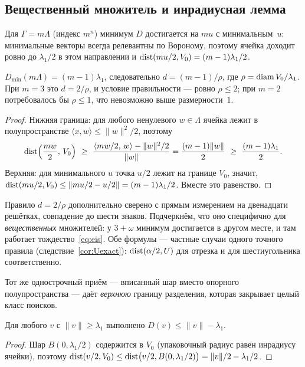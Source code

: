\subsection{Вещественный множитель и инрадиусная лемма}
\label{ssec:mult}

Для $\Gamma=m\Lambda$ (индекс $m^n$) минимум $D$ достигается на $mu$ с
минимальным~$u$: минимальные векторы всегда релевантны по Вороному, поэтому
ячейка доходит ровно до $\lambda_1/2$ в этом направлении и
$\operatorname{dist}(mu/2,V_0)=(m-1)\lambda_1/2$.

\begin{proposition}\label{prop:mult}
$D_{\min}(m\Lambda)=(m-1)\lambda_1$, следовательно
$d=(m-1)/\rho$, где $\rho=\operatorname{diam} V_0/\lambda_1$. При $m=3$ это $d=2/\rho$, и
условие правильности --- ровно $\rho\le2$; при $m=2$ потребовалось бы
$\rho\le1$, что невозможно выше размерности~$1$.
\end{proposition}

\begin{proof}
Нижняя граница: для любого ненулевого $w\in\Lambda$ ячейка лежит в
полупространстве $\langle x,w\rangle\le\|w\|^2/2$, поэтому
\[
\dist\Bigl(\frac{mw}2,\,V_0\Bigr)\ \ge\
\frac{\langle mw/2,\,w\rangle-\|w\|^2/2}{\|w\|}
=\frac{(m-1)\|w\|}2\ \ge\ \frac{(m-1)\lambda_1}2.
\]
Верхняя: для минимального $u$ точка $u/2$ лежит на границе $V_0$, значит,
$\operatorname{dist}(mu/2,V_0)\le\|mu/2-u/2\|=(m-1)\lambda_1/2$. Вместе это равенство.
\end{proof}

Правило $d=2/\rho$ дополнительно сверено с прямым измерением на двенадцати
решётках, совпадение до шести знаков. Подчеркнём, что оно специфично для
\emph{вещественных} множителей: у $3+\omega$ минимум достигается в другом
месте, и там работает тождество~\eqref{eq:eis}. Обе формулы --- частные случаи
одного точного правила (следствие~\ref{cor:Uexact}): $\operatorname{dist}(\alpha/2,U)$ для
отрезка и для шестиугольника соответственно.

Тот же одностроч\-ный приём --- вписанный шар вместо опорного полупространства
--- даёт \emph{верхнюю} границу разделения, которая закрывает целый класс
поисков.

\begin{lemma}\label{lem:inradius}
Для любого $v$ с $\|v\|\ge\lambda_1$ выполнено
$D(v)\le\|v\|-\lambda_1$.
\end{lemma}

\begin{proof}
Шар $B(0,\lambda_1/2)$ содержится в $V_0$ (упаковочный радиус равен инрадиусу
ячейки), поэтому $\operatorname{dist}(v/2,V_0)\le\operatorname{dist}\bigl(v/2,B(0,\lambda_1/2)\bigr)
=\|v\|/2-\lambda_1/2$.
\end{proof}


